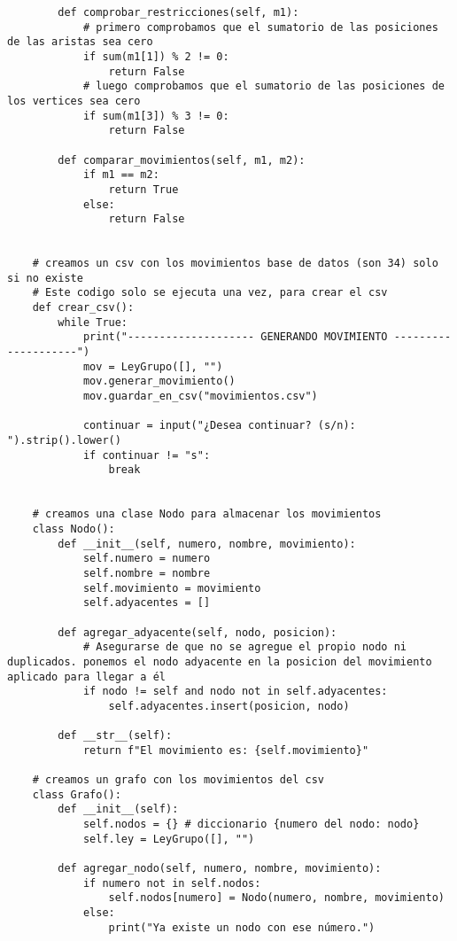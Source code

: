 \begin{lstlisting}
        def comprobar_restricciones(self, m1):
            # primero comprobamos que el sumatorio de las posiciones de las aristas sea cero
            if sum(m1[1]) % 2 != 0:
                return False
            # luego comprobamos que el sumatorio de las posiciones de los vertices sea cero
            if sum(m1[3]) % 3 != 0:
                return False
            
        def comparar_movimientos(self, m1, m2):
            if m1 == m2:
                return True
            else:
                return False
    
    
    # creamos un csv con los movimientos base de datos (son 34) solo si no existe
    # Este codigo solo se ejecuta una vez, para crear el csv
    def crear_csv():
        while True:
            print("-------------------- GENERANDO MOVIMIENTO --------------------")
            mov = LeyGrupo([], "")
            mov.generar_movimiento()
            mov.guardar_en_csv("movimientos.csv")
            
            continuar = input("¿Desea continuar? (s/n): ").strip().lower()
            if continuar != "s":
                break
            
    
    # creamos una clase Nodo para almacenar los movimientos
    class Nodo():
        def __init__(self, numero, nombre, movimiento):
            self.numero = numero
            self.nombre = nombre
            self.movimiento = movimiento
            self.adyacentes = []
        
        def agregar_adyacente(self, nodo, posicion):
            # Asegurarse de que no se agregue el propio nodo ni duplicados. ponemos el nodo adyacente en la posicion del movimiento aplicado para llegar a él
            if nodo != self and nodo not in self.adyacentes:
                self.adyacentes.insert(posicion, nodo)
                
        def __str__(self):
            return f"El movimiento es: {self.movimiento}"    
    
    # creamos un grafo con los movimientos del csv
    class Grafo():
        def __init__(self):
            self.nodos = {} # diccionario {numero del nodo: nodo}
            self.ley = LeyGrupo([], "")
        
        def agregar_nodo(self, numero, nombre, movimiento):
            if numero not in self.nodos:
                self.nodos[numero] = Nodo(numero, nombre, movimiento)
            else:
                print("Ya existe un nodo con ese número.")
        

\end{lstlisting}
